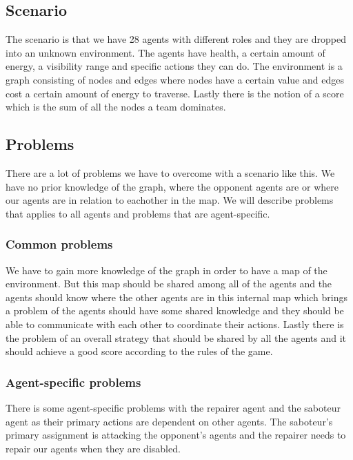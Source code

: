 \documentclass[11pt]{article}
\begin{document}
\subsection{Scenario}
The scenario is that we have 28 agents with different roles and they are dropped into an unknown environment. The agents have health, a certain amount of energy, a visibility range and specific actions they can do. The environment is a graph consisting of nodes and edges where nodes have a certain value and edges cost a certain amount of energy to traverse. Lastly there is the notion of a score which is the sum of all the nodes a team dominates.
 
\subsection{Problems}
There are a lot of problems we have to overcome with a scenario like this. We have no prior knowledge of the graph, where the opponent agents are or where our agents are in relation to eachother in the map. We will describe problems that applies to all agents and problems that are agent-specific.
 
\subsubsection{Common problems}
We have to gain more knowledge of the graph in order to have a map of the environment. But this map should be shared among all of the agents and the agents should know where the other agents are in this internal map which brings a problem of the agents should have some shared knowledge and they should be able to communicate with each other to coordinate their actions. Lastly there is the problem of an overall strategy that should be shared by all the agents and it should achieve a good score according to the rules of the game.
 
\subsubsection{Agent-specific problems}
There is some agent-specific problems with the repairer agent and the saboteur agent as their primary actions are dependent on other agents. The saboteur's primary assignment is attacking the opponent's agents and the repairer needs to repair our agents when they are disabled.
\end{document}
